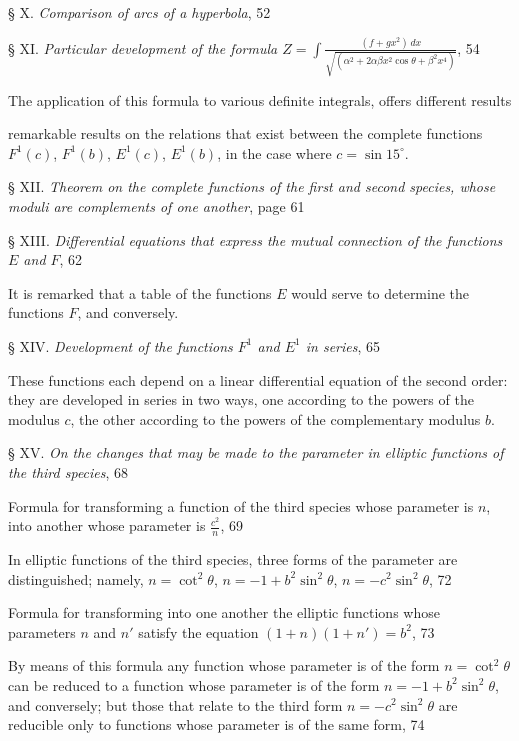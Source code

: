 \documentclass{article}
\begin{document}
§ X. \emph{Comparison of arcs of a hyperbola}, 52

§ XI. \emph{Particular development of the formula $\displaystyle Z=\int\frac{(f+gx^{2})\,dx}{\sqrt{(\alpha^{2}+2\alpha\beta x^{2}\cos\theta+\beta^{2}x^{4})}}$}, 54

The application of this formula to various definite integrals, offers different results

remarkable results on the relations that exist between the complete functions $F^{1}(c)$, $F^{1}(b)$, $E^{1}(c)$, $E^{1}(b)$, in the case where $c=\sin15^{\circ}$.

§ XII. \emph{Theorem on the complete functions of the first and second species, whose moduli are complements of one another}, page 61

§ XIII. \emph{Differential equations that express the mutual connection of the functions $E$ and $F$}, 62

It is remarked that a table of the functions $E$ would serve to determine the functions $F$, and conversely.

§ XIV. \emph{Development of the functions $F^{1}$ and $E^{1}$ in series}, 65

These functions each depend on a linear differential equation of the second order: they are developed in series in two ways, one according to the powers of the modulus $c$, the other according to the powers of the complementary modulus $b$.

§ XV. \emph{On the changes that may be made to the parameter in elliptic functions of the third species}, 68

Formula for transforming a function of the third species whose parameter is $n$, into another whose parameter is $\frac{c^{2}}{n}$, 69

In elliptic functions of the third species, three forms of the parameter are distinguished; namely, $n=\cot^{2}\theta$, $n=-1+b^{2}\sin^{2}\theta$, $n=-c^{2}\sin^{2}\theta$, 72

Formula for transforming into one another the elliptic functions whose parameters $n$ and $n'$ satisfy the equation $(1+n)(1+n')=b^{2}$, 73

By means of this formula any function whose parameter is of the form $n=\cot^{2}\theta$ can be reduced to a function whose parameter is of the form $n=-1+b^{2}\sin^{2}\theta$, and conversely; but those that relate to the third form $n=-c^{2}\sin^{2}\theta$ are reducible only to functions whose parameter is of the same form, 74
\end{document}
